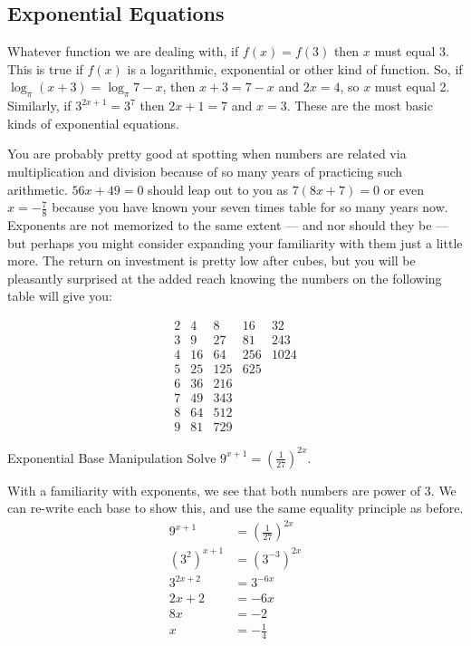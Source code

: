 
\subsection{Exponential Equations}



Whatever function we are dealing with, if $f(x)=f(3)$ then $x$ must equal 3.  This is true
if $f(x)$ is a logarithmic, exponential or other kind of function.  So, if $\log_{\pi}(x+3) =
\log_{\pi}{7-x}$, then $x+3 = 7 - x$ and $2x = 4$, so $x$ must equal 2.  Similarly,
if $3^{2x+1} = 3^7$ then $2x+1 =7$ and $x=3$.  These are the most basic kinds of
exponential equations.

You are probably pretty good at spotting when numbers are related via multiplication
and division because of so many years of practicing such arithmetic.  $56x+49=0$ should
leap out to you as $7(8x+7)=0$ or even $x=-\frac{7}{8}$ because you have known
your seven times table for so many years now.  Exponents are not memorized to the
same extent --- and nor should they be --- but perhaps you might consider expanding your
familiarity with them just a little more.  The return on investment is pretty low after cubes,
but you will be pleasantly surprised at the added reach knowing the numbers on the following
table will give you:

$$
\begin{matrix} 
2 & 4 & 8 & 16 & 32 \\ 
3 & 9 & 27 & 81 & 243 \\ 
4 & 16 & 64 & 256 & 1024 \\ 
5 & 25 & 125 & 625 &  \\ 
6 & 36 & 216 &  &  \\ 
7 & 49 & 343 &  &  \\ 
8 & 64 & 512 &  &  \\ 
9 & 81 & 729 &  &  
\end{matrix}
$$

\begin{example}{Exponential Base Manipulation}
\exProblem
Solve $9^{x+1}=\left(\frac{1}{27}\right)^{2x}$.

\exSolution
With a familiarity with exponents, we see that both numbers are power of 3.  We can 
re-write each base to show this, and use the same equality principle as before.
\begin{align*}
	9^{x+1} &= \left(\frac{1}{27}\right)^{2x}\\
	(3^2)^{x+1} &= (3^{-3})^{2x}\\
	3^{2x+2} &= 3^{-6x}\\
	2x + 2 &= -6x\\
	8x &= -2\\
	x &= -\frac{1}{4}
\end{align*}
\end{example}

